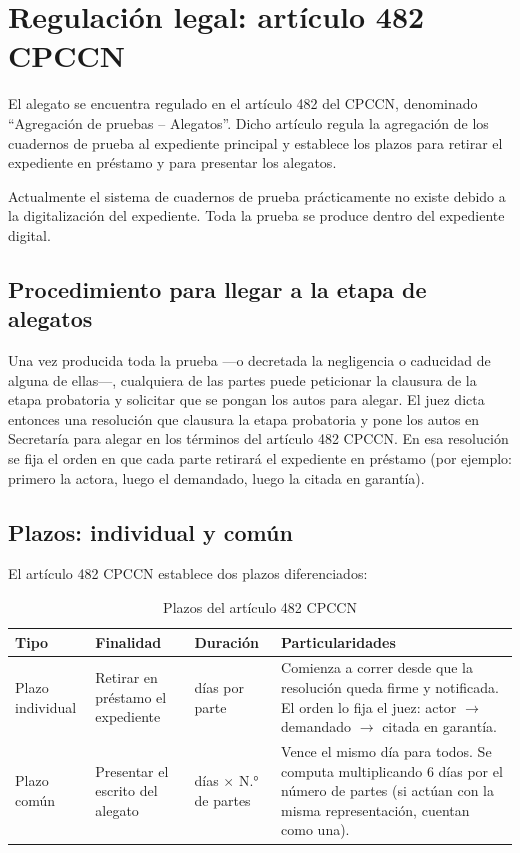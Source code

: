 \documentclass[12pt,oneside]{book}
\begin{document}
\section{Regulación legal: artículo 482 CPCCN}

El alegato se encuentra regulado en el artículo 482 del CPCCN, denominado ``Agregación de pruebas -- Alegatos''. Dicho artículo regula la agregación de los cuadernos de prueba al expediente principal y establece los plazos para retirar el expediente en préstamo y para presentar los alegatos.

\begin{note}
Actualmente el sistema de cuadernos de prueba prácticamente no existe debido a la digitalización del expediente. Toda la prueba se produce dentro del expediente digital.
\end{note}

\subsection{Procedimiento para llegar a la etapa de alegatos}

Una vez producida toda la prueba —o decretada la negligencia o caducidad de alguna de ellas—, cualquiera de las partes puede peticionar la clausura de la etapa probatoria y solicitar que se pongan los autos para alegar. El juez dicta entonces una resolución que clausura la etapa probatoria y pone los autos en Secretaría para alegar en los términos del artículo 482 CPCCN. En esa resolución se fija el orden en que cada parte retirará el expediente en préstamo (por ejemplo: primero la actora, luego el demandado, luego la citada en garantía).

\subsection{Plazos: individual y común}

El artículo 482 CPCCN establece dos plazos diferenciados:

\begin{table}[H]
\centering
\begin{tabularx}{\textwidth}{
    >{\raggedright\arraybackslash}p{}
    >{\raggedright\arraybackslash}p{}
    >{\raggedright\arraybackslash}p{}
    >{\raggedright\arraybackslash}X
}
\toprule
\textbf{Tipo} & \textbf{Finalidad} & \textbf{Duración} & \textbf{Particularidades} \\
\midrule
Plazo individual & Retirar en préstamo el expediente & 6 días por parte & Comienza a correr desde que la resolución queda firme y notificada. El orden lo fija el juez: actor $\to$ demandado $\to$ citada en garantía. \\
\addlinespace
Plazo común & Presentar el escrito del alegato & 6 días $\times$ N.° de partes & Vence el mismo día para todos. Se computa multiplicando 6 días por el número de partes (si actúan con la misma representación, cuentan como una). \\
\bottomrule
\end{tabularx}
\caption{Plazos del artículo 482 CPCCN}
\end{table}
\end{document}

